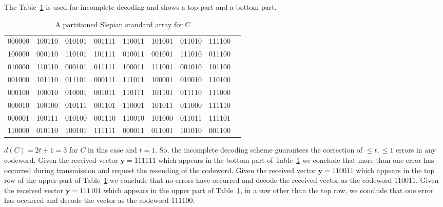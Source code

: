 The Table~\ref{tab:15} is used for incomplete decoding and shows a top part and a bottom part.
\begin{table}[!htp]\centering
\begin{tabular}{lrrrrrrrr}\toprule
000000 &100110 &010101 &001111 &110011 &101001 &011010 &111100 \\
100000 &000110 &110101 &101111 &010011 &001001 &111010 &011100 \\
010000 &110110 &000101 &011111 &100011 &111001 &001010 &101100 \\
001000 &101110 &011101 &000111 &111011 &100001 &010010 &110100 \\
000100 &100010 &010001 &001011 &110111 &101101 &011110 &111000 \\
000010 &100100 &010111 &001101 &110001 &101011 &011000 &111110 \\
000001 &100111 &010100 &001110 &110010 &101000 &011011 &111101 \\
\midrule
110000 &010110 &100101 &111111 &000011 &011001 &101010 &001100 \\
\bottomrule
\end{tabular}
\caption{A partitioned Slepian standard array for $C$}\label{tab:15}
\end{table}
$d(C) = 2t + 1 =3$ for $C$ in this case and $t=1$. So, the incomplete decoding scheme guarantees the correction of $\leq t, \leq 1$ errors in any codeword.
\qsubpart
Given the received vector $\bm{y} = 111111$ which appears in the bottom part of Table~\ref{tab:15} we conclude that more than one error has occurred during transmission and request the resending of the codeword.
\qsubpart
Given the received vector $\bm{y} =110011$ which appears in the top row of the upper part of Table~\ref{tab:15} we conclude that no errors have occurred and decode the received vector as the codeword $110011$.
\qsubpart
Given the received vector $\bm{y} = 111101$ which appears in the upper part of Table~\ref{tab:15}, in a row other than the top row, we conclude that one error has occurred and decode the vector as the codeword $111100$.